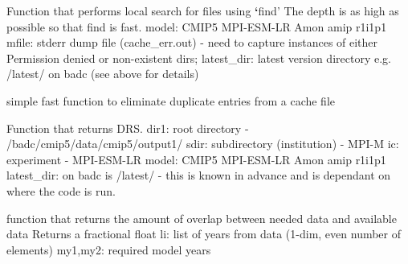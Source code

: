 \documentclass[letterpaper,10pt,english]{sphinxmanual}
\begin{document}

\begin{fulllineitems}
\label{\detokenize{index:cmip5datafinder.find_local_files}}
Function that performs local search for files using {\color{red}\bfseries{}{}`}find'
The depth is as high as possible so that find is fast.
model: CMIP5 MPI-ESM-LR Amon amip r1i1p1
mfile: stderr dump file (cache\_err.out) - need to capture
instances of either Permission denied or non-existent dirs;
latest\_dir: latest version directory e.g. /latest/ on badc
(see above for details)

\end{fulllineitems}


\begin{fulllineitems}
\label{\detokenize{index:cmip5datafinder.fix_duplicate_entries}}
simple fast function to eliminate duplicate entries
from a cache file

\end{fulllineitems}


\begin{fulllineitems}
\label{\detokenize{index:cmip5datafinder.get_drs}}
Function that returns DRS.
dir1: root directory - /badc/cmip5/data/cmip5/output1/
sdir: subdirectory (institution) - MPI-M
ic: experiment - MPI-ESM-LR
model: CMIP5 MPI-ESM-LR Amon amip r1i1p1
latest\_dir: on badc is /latest/ - this is known in advance
and is dependant on where the code is run.

\end{fulllineitems}


\begin{fulllineitems}
\label{\detokenize{index:cmip5datafinder.get_overlap}}
function that returns the amount of overlap
between needed data and available data
Returns a fractional float
li: list of years from data (1-dim, even number of elements)
my1,my2: required model years

\end{fulllineitems}
\end{document}

